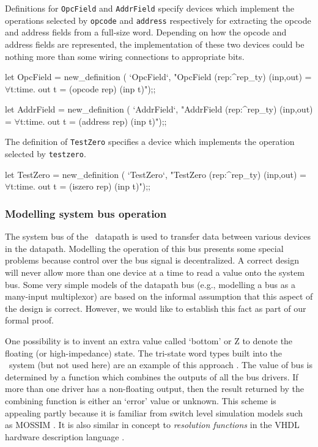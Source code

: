Definitions for \verb"OpcField" and \verb"AddrField"
specify devices which implement the operations
selected by \verb"opcode" and \verb"address"
respectively for
extracting the opcode and address fields from a full-size word.
Depending on how the opcode and address fields are represented,
the implementation of these two devices could be nothing more than some
wiring connections to appropriate bits.

\begintt
let OpcField = new_definition (
  `OpcField`,
  "OpcField (rep:^rep_ty) (inp,out) =
    \(\forall\)t:time. out t = (opcode rep) (inp t)");;

let AddrField = new_definition (
  `AddrField`,
  "AddrField (rep:^rep_ty) (inp,out) =
    \(\forall\)t:time. out t = (address rep) (inp t)");;
\endtt

The definition of \verb"TestZero" specifies a device which implements
the operation selected by \verb"testzero".

\begintt
let TestZero = new_definition (
  `TestZero`,
  "TestZero (rep:^rep_ty) (inp,out) =
    \(\forall\)t:time. out t = (iszero rep) (inp t)");;
\endtt

\subsubsection{Modelling system bus operation}

The system bus of the \Tamarack\ datapath is used to transfer
data between various devices in the datapath.
Modelling the operation of this bus presents some special problems
because control over the bus signal is decentralized.
A correct design will never allow more than one device at a time
to read a value onto the system bus.
Some very simple models of the datapath bus
(e.g., modelling a bus as a many-input multiplexor)
are based on the informal assumption that
this aspect of the design is correct.
However, we would like to establish this fact as part of our formal proof.

One possibility is to invent an extra value called `bottom' or Z
to denote the floating (or high-impedance) state.
The tri-state word types built into the \HOL\ system
(but not used here) are an example of this approach
\cite{Gordon:tech41,Gordon:tech42,Joyce:calgary86}.
The value of bus is determined by a function
which combines the outputs
of all the bus drivers.
If more than one driver has a non-floating output,
then the result returned by the combining function is either
an `error' value or unknown.
This scheme is appealing partly because it is
familiar from switch level simulation models such as MOSSIM
\cite{Bryant:thesis}.
It is also similar in concept to {\it resolution functions} in
the VHDL hardware description language
\cite{Armstrong}.

